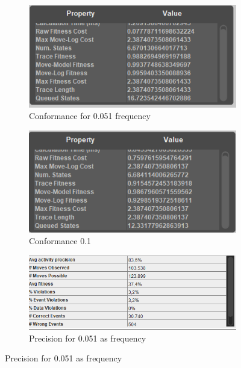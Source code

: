 \begin{figure}[!htbp]
\centering
\begin{subfigure}{.4\textwidth}
  \centering
  \includegraphics[width=\linewidth]{P_Conformance0-051.PNG}
  \caption{Conformance for 0.051 frequency}
  \label{fig:P_Conf0-051}
\end{subfigure}%
\begin{subfigure}{.4\textwidth}
  \centering
  \includegraphics[width=\linewidth]{P_Conformance0-1.PNG}
  \caption{Conformance 0.1}
  \label{fig:P_Conf0-1}
\end{subfigure}
\begin{subfigure}{.4\textwidth}
  \centering
  \includegraphics[width=\linewidth]{P_Precision0-051.PNG}
  \caption{Precision for 0.051 as frequency}
  \label{fig:P_Prec0-051}
\end{subfigure}%

\end{figure}
